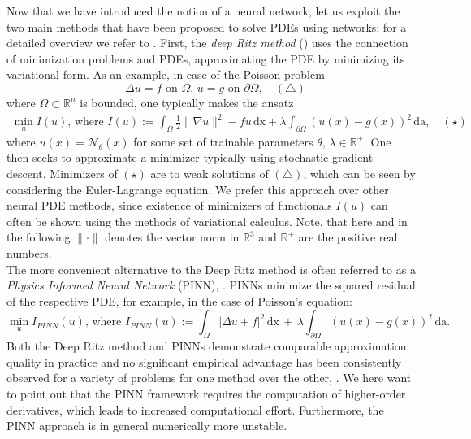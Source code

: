 \documentclass[draft,12pt,openany]{book}
\newcommand{\R}{\mathbb{R}}
\theoremstyle{plainnormal}
\theoremstyle{remark}
\begin{document}
Now that we have introduced the notion of a neural network, let us exploit the two main methods that have been proposed to solve PDEs using networks; for a detailed overview we refer to \cite{E_2021}. First, the \emph{deep Ritz method} (\cite{deepritzmethoddeep}) uses the connection of minimization problems and PDEs, approximating the PDE by minimizing its variational form. As an example, in case of the Poisson problem $$-\Delta u = f \text{ on } \Omega,\, u = g \text{ on } \partial \Omega, \quad (\triangle)
$$ where $\Omega \subset \R^n $ is bounded, one typically makes the ansatz \begin{align*}
    \min_u I(u)\text{, where } I(u) := \int_\Omega \frac{1}{2} \|\nabla u\|^2 - fu \,\mathrm{dx} + \lambda\int_{\partial \Omega} (u(x)- g(x))^2\, \mathrm{da},\quad(\star)
\end{align*}
where $u(x) = \mathcal N_\theta(x)$ for some set of trainable parameters $\theta$, $\lambda\in \R^+$. One then seeks to approximate a minimizer typically using stochastic gradient descent. Minimizers of $(\star)$ are to weak solutions of $(\triangle)$, which can be seen by considering the Euler-Lagrange equation. We prefer this approach over other neural PDE methods, since existence of minimizers of functionals $I(u)$ can often be shown using the methods of variational calculus. Note, that here and in the following $\|\cdot\|$ denotes the vector norm in $\R^3$ and $\R^+$ are the positive real numbers.\\
The more convenient alternative to the Deep Ritz method is often referred to as a \emph{Physics Informed Neural Network} (PINN), \cite{RAISSI2019686}. PINNs minimize the squared residual of the respective PDE, for example, in the case of Poisson's equation:
$$ \min_u I_{PINN}(u)\text{, where } I_{PINN}(u) := \int_\Omega |\Delta u + f|^2 \,\mathrm{dx}\, +\, \lambda \int_{\partial\Omega}(u(x) - g(x))^2 \, \mathrm{da}  .$$
Both the Deep Ritz method and PINNs demonstrate comparable approximation quality in practice and no significant empirical advantage has been consistently observed for a variety of problems for one method over the other, \cite{yang2025numericalstudyhyperparameter}. 
We here want to point out that the PINN framework requires the computation of higher-order derivatives, which leads to increased computational effort. Furthermore, the PINN approach is in general numerically more unstable.
\end{document}
